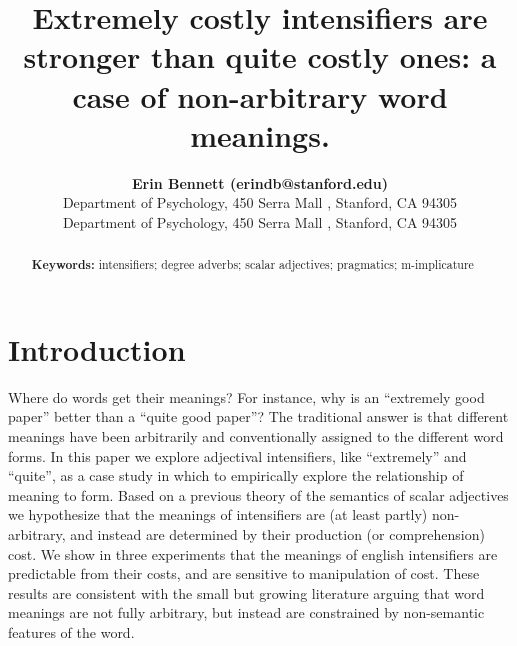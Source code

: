 \documentclass[10pt,letterpaper]{article}
\title{Extremely costly intensifiers are stronger than quite costly ones: a case of non-arbitrary word meanings.}
\author{{\large \bf Erin Bennett (erindb@stanford.edu)} \\
  Department of Psychology, 450 Serra Mall , Stanford, CA 94305
  \AND {\large \bf Noah Goodman (ngoodman@stanford.edu)} \\
  Department of Psychology, 450 Serra Mall , Stanford, CA 94305}
\begin{document}
\maketitle


\begin{abstract}


\textbf{Keywords:} 
intensifiers; degree adverbs; scalar adjectives; pragmatics; m-implicature
\end{abstract}


\section{Introduction}


Where do words get their meanings? For instance, why is an ``extremely good paper'' better than a ``quite good paper''? The traditional answer \cite{saussure} is that different meanings have been arbitrarily and conventionally assigned to the different word forms.
In this paper we explore adjectival intensifiers, like ``extremely'' and ``quite'', as a case study in which to empirically explore the relationship of meaning to form.
Based on a previous theory of the semantics of scalar adjectives we hypothesize that the meanings of intensifiers are (at least partly) non-arbitrary, and instead are determined by their production (or comprehension) cost. 
We show in three experiments that the meanings of english intensifiers are predictable from their costs, and are sensitive to manipulation of cost.
These results are consistent with the small but growing literature arguing that word meanings are not fully arbitrary, but instead are constrained by non-semantic features of the word. 

\end{document}
